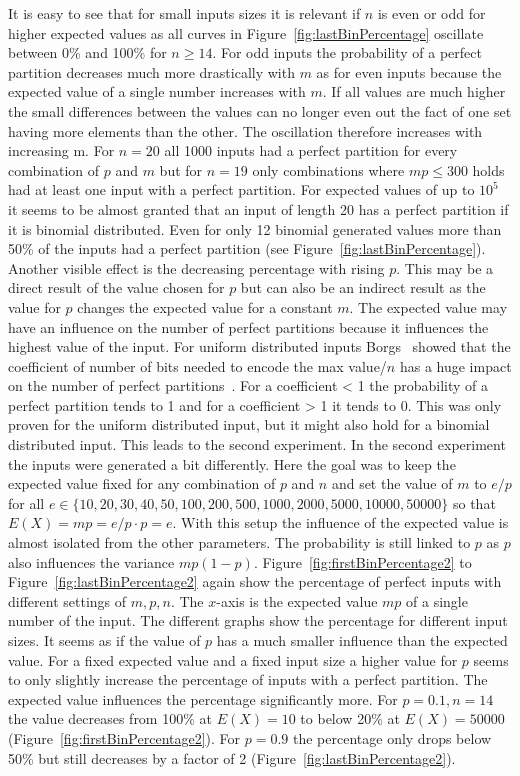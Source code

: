 It is easy to see that for small inputs sizes it is relevant if $n$ is even or odd for higher expected values as all curves in Figure~\ref{fig:lastBinPercentage} oscillate between 0\% and 100\% for $n\ge14$.
For odd inputs the probability of a perfect partition decreases much more drastically with $m$ as for even inputs because the expected value of a single number increases with $m$.
If all values are much higher the small differences between the values can no longer even out the fact of one set having more elements than the other.
The oscillation therefore increases with increasing m.
For $n=20$ all 1000 inputs had a perfect partition for every combination of $p$ and $m$ but for $n=19$ only combinations where $mp\le300$ holds had at least one input with a perfect partition.
For expected values of up to $10^5$ it seems to be almost granted that an input of length 20 has a perfect partition if it is binomial distributed.
Even for only 12 binomial generated values more than 50\% of the inputs had a perfect partition (see Figure~\ref{fig:lastBinPercentage}).
Another visible effect is the decreasing percentage with rising $p$.
This may be a direct result of the value chosen for $p$ but can also be an indirect result as the value for $p$ changes the expected value for a constant $m$.
The expected value may have an influence on the number of perfect partitions because it influences the highest value of the input.
For uniform distributed inputs Borgs \etal~showed that the coefficient of number of bits needed to encode the max value/$n$ has a huge impact on the number of perfect partitions~\cite{borgs2001phase}.
For a coefficient < 1 the probability of a perfect partition tends to 1 and for a coefficient > 1 it tends to 0.
This was only proven for the uniform distributed input, but it might also hold for a binomial distributed input.
This leads to the second experiment.\newline
In the second experiment the inputs were generated a bit differently.
Here the goal was to keep the expected value fixed for any combination of $p$ and $n$ and set the value of $m$ to $e/p$ for all $e \in \{10, 20, 30, 40, 50, 100, 200, 500, 1000, 2000, 5000, 10000, 50000\}$ so that $E(X)=mp=e/p\cdot p=e$.
With this setup the influence of the expected value is almost isolated from the other parameters.
The probability is still linked to $p$ as $p$ also influences the variance $mp(1-p)$.\newline
Figure~\ref{fig:firstBinPercentage2} to Figure~\ref{fig:lastBinPercentage2} again show the percentage of perfect inputs with different settings of $m,p,n$.
The $x$-axis is the expected value $mp$ of a single number of the input. The different graphs show the percentage for different input sizes.
It seems as if the value of $p$ has a much smaller influence than the expected value.
For a fixed expected value and a fixed input size a higher value for $p$ seems to only slightly increase the percentage of inputs with a perfect partition.
The expected value influences the percentage significantly more.
For $p=0.1, n=14$ the value decreases from 100\% at $E(X)=10$ to below 20\% at $E(X)=50000$ (Figure~\ref{fig:firstBinPercentage2}).
For $p=0.9$ the percentage only drops below 50\% but still decreases by a factor of 2 (Figure~\ref{fig:lastBinPercentage2}).

